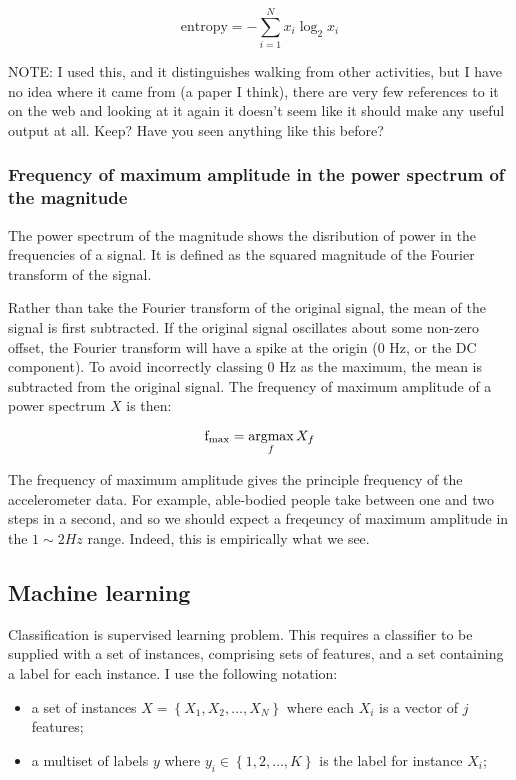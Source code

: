         $$\mathrm{entropy} = -\sum\limits_{i=1}^N x_i \log_2 x_i$$
        
        NOTE: I used this, and it distinguishes walking from other activities, but I have no idea where it came from (a paper I think), there are very few references to it on the web and looking at it again it doesn't seem like it should make any useful output at all. Keep? Have you seen anything like this before?
      \subsubsection{Frequency of maximum amplitude in the power spectrum of the magnitude}
        The power spectrum of the magnitude shows the disribution of power in the frequencies of a signal. It is defined as the squared magnitude of the Fourier transform of the signal.
        
        Rather than take the Fourier transform of the original signal, the mean of the signal is first subtracted. If the original signal oscillates about some non-zero offset, the Fourier transform will have a spike at the origin (0 \si{Hz}, or the DC component). To avoid incorrectly classing 0 \si{Hz} as the maximum, the mean is subtracted from the original signal. The frequency of maximum amplitude of a power spectrum $X$ is then:
        
        $$\mathrm{f}_\mathrm{max} = \operatorname*{argmax}_f X_f$$
        
        The frequency of maximum amplitude gives the principle frequency of the accelerometer data. For example, able-bodied people take between one and two steps in a second, and so we should expect a freqeuncy of maximum amplitude in the $1 \sim 2 \si{Hz}$ range. Indeed, this is empirically what we see.
        
    \subsection{Machine learning}
      Classification is supervised learning problem. This requires a classifier to be supplied with a set of instances, comprising sets of features, and a set containing a label for each instance. I use the following notation:
      \begin{itemize}
        \item a set of instances $X = \left\{X_1, X_2, \dots, X_N\right\}$ where each $X_i$ is a vector of $j$ features;
        \item a multiset of labels $y$ where $y_i \in \left\{1, 2, \dots, K\right\}$ is the label for instance $X_i$;
      \end{itemize}  
      
